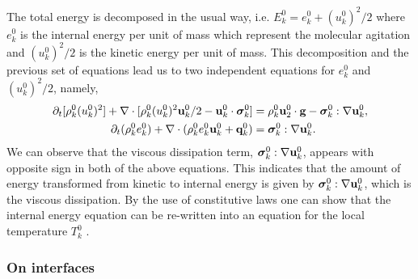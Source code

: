 The total energy is decomposed in the usual way, i.e. $E_k^0 = e_k^0 + (u_k^0)^2/2$ where  $e_k^0$ is the internal energy per unit of mass which represent the molecular agitation and $(u_k^0)^2/2$ is the kinetic energy per unit of mass.
This decomposition and the previous set of equations lead us to two independent equations for $e_k^0$ and $(u_k^0)^2/2$, namely,
\begin{align}
    \label{eq:dt_rhou_k2}
    \partial_t [\rho_k^0(u_k^0)^2]  
    + \mathbf{\nabla}\cdot [\rho_k^0(u_k^0)^2\textbf{u}_k^0/2 - \textbf{u}_k^0 \cdot \bm{\sigma}_k^0]
    &=
    \rho_k^0\textbf{u}_2^0 \cdot \textbf{g}  
    -  \bm{\sigma}_k^0 : \mathbf{\nabla} \textbf{u}_k^0,
    \\
    \label{eq:dt_rhoe_k}
    \partial_t (\rho_k^0e_k^0)  
    + \mathbf{\nabla}\cdot (
        \rho_k^0e_k^0\textbf{u}_k^0
        + \textbf{q}_k^0
        )
    &= 
    \bm{\sigma}_k^0 : \mathbf{\nabla} \textbf{u}_k^0. 
\end{align} 
We can observe that the viscous dissipation term, $\bm{\sigma}_k^0 : \mathbf{\nabla} \textbf{u}_k^0$,  appears with opposite sign in both of the above equations.
This indicates that the amount of energy transformed from kinetic to internal energy is given by $\bm{\sigma}_k^0 : \mathbf{\nabla} \textbf{u}_k^0$, which is the viscous dissipation. 
By the use of constitutive laws one can show that the internal energy equation can be re-written into an equation for the local temperature $T_k^0$ \citep{ishii2010thermo}.

\subsubsection{On interfaces}

